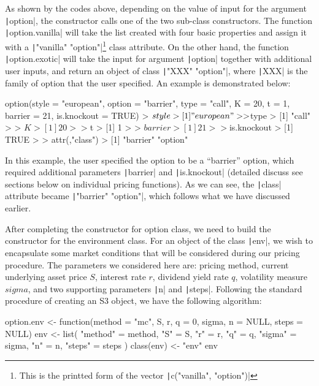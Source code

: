 As shown by the codes above, depending on the value of input for the argument \texttt|option|, the constructor calls one of the two sub-class constructors. The function \texttt|option.vanilla| will take the list created with four basic properties and assign it with a \texttt|"vanilla" "option"|\footnote{This is the printted form of the vector \texttt|c("vanilla", "option")|} class attribute. On the other hand, the function \texttt|option.exotic| will take the input for argument \texttt|option| together with additional user inputs, and return an object of class \texttt|"XXX" "option"|, where \texttt|XXX| is the family of option that the user specified. An example is demonstrated below:

\begin{Rminted}
option(style = "european",
       option = "barrier",
       type = "call",
       K = 20,
       t = 1,
       barrier = 21,
       is.knockout = TRUE)
> $style
> [1] "european"
> 
> $type
> [1] "call"
> 
> $K
> [1] 20
> 
> $t
> [1] 1
> 
> $barrier
> [1] 21
> 
> $is.knockout
> [1] TRUE
> 
> attr(,"class")
> [1] "barrier" "option"
\end{Rminted}

In this example, the user specified the option to be a ``barrier'' option, which required additional parameters \texttt|barrier| and \texttt|is.knockout| (detailed discuss see sections below on individual pricing functions). As we can see, the \texttt|class| attribute became \texttt|"barrier" "option"|, which follows what we have discussed earlier.

After completing the constructor for option class, we need to build the constructor for the environment class. For an object of the class \texttt|env|, we wish to encapsulate some market conditions that will be considered during our pricing procedure. The parameters we considered here are: pricing method, current underlying asset price $S$, interest rate $r$, dividend yield rate $q$, volatility measure $sigma$, and two supporting parameters \texttt|n| and \texttt|steps|. Following the standard procedure of creating an S3 object, we have the following algorithm:

\begin{Rminted}
option.env <- function(method = "mc", S, r, q = 0, sigma, n = NULL, steps = NULL) {
    env <- list(
        "method" = method,
        "S" = S,
        "r" = r,
        "q" = q,
        "sigma" = sigma,
        "n" = n,
        "steps" = steps
    )
    class(env) <- "env"
    env
}
\end{Rminted}

